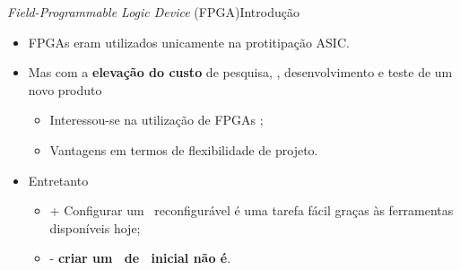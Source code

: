       \begin{frame}{\textit{Field-Programmable Logic Device} (FPGA)}{Introdução} \vspace{-1em}
         \begin{itemize}
            \setlength{\itemsep}{1.5em}
            \item FPGAs eram utilizados unicamente na protitipação ASIC.
            
            \item Mas com a \textbf{elevação do custo} de pesquisa, \design, desenvolvimento e teste de um novo produto
            \begin{itemize}\setlength{\itemsep}{0.5em}
               \item Interessou-se na utilização de FPGAs \cite{Mei2000};
               \item Vantagens em termos de flexibilidade de projeto.
            \end{itemize}
            
            \item Entretanto \cite{Sass2010}
            \begin{itemize}\setlength{\itemsep}{0.5em}
               \item + Configurar um \hardware\ reconfigurável é uma tarefa fácil graças às ferramentas disponíveis hoje;
               
               \item - \textbf{criar um \design\ de \hardware\ inicial não é}.
            \end{itemize}
            
         \end{itemize}
      \end{frame}
   
